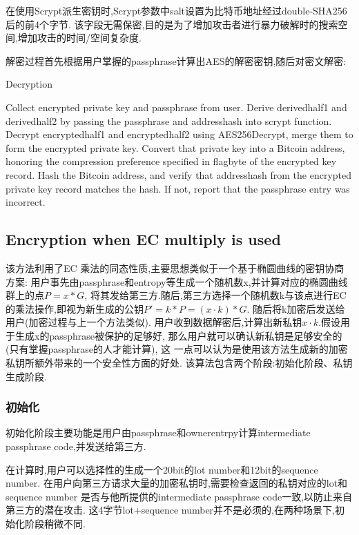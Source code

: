 在使用Scrypt派生密钥时,Scrypt参数中salt设置为比特币地址经过double-SHA256后的前4个字节.
该字段无需保密,目的是为了增加攻击者进行暴力破解时的搜索空间,增加攻击的时间/空间复杂度.



解密过程首先根据用户掌握的passphrase计算出AES的解密密钥,随后对密文解密:

\begin{algorithm}[tbp]\footnotesize
\caption{Decryption}
  	\begin{algorithmic}[1]
	    \STATE Collect encrypted private key and passphrase from user.  
		\STATE Derive derivedhalf1 and derivedhalf2 by passing the passphrase and addresshash into scrypt function.
		\STATE Decrypt encryptedhalf1 and encryptedhalf2 using AES256Decrypt, merge them to form the encrypted private key. 
		\STATE Convert that private key into a Bitcoin address, honoring the compression preference specified in flagbyte of the encrypted key record.
		\STATE Hash the Bitcoin address, and verify that addresshash from the encrypted private key record matches the hash. If not, report that the passphrase entry was incorrect.  
    \end{algorithmic}
\end{algorithm}


\subsection{Encryption when EC multiply is used}

该方法利用了EC 乘法的同态性质,主要思想类似于一个基于椭圆曲线的密钥协商方案:
用户事先由passphrase和entropy等生成一个随机数x,并计算对应的椭圆曲线群上的点$P=x*G$,
将其发给第三方.随后,第三方选择一个随机数k与该点进行EC的乘法操作,即视为新生成的公钥$P'=k*P=(x \cdot k)*G$.
随后将k加密后发送给用户(加密过程与上一个方法类似).
用户收到数据解密后,计算出新私钥$x\cdot k$.假设用于生成x的passphrase被保护的足够好,
那么用户就可以确认新私钥是足够安全的(只有掌握passphrase的人才能计算), 这
一点可以认为是使用该方法生成新的加密私钥所额外带来的一个安全性方面的好处.
该算法包含两个阶段:初始化阶段、私钥生成阶段.

\subsubsection{初始化}
初始化阶段主要功能是用户由passphrase和ownerentrpy计算intermediate passphrase code,并发送给第三方.  

在计算时,用户可以选择性的生成一个20bit的lot number和12bit的sequence number.
在用户向第三方请求大量的加密私钥时,需要检查返回的私钥对应的lot和sequence number
是否与他所提供的intermediate passphrase code一致,以防止来自第三方的潜在攻击.
这4字节lot+sequence number并不是必须的,在两种场景下,初始化阶段稍微不同. 
 
